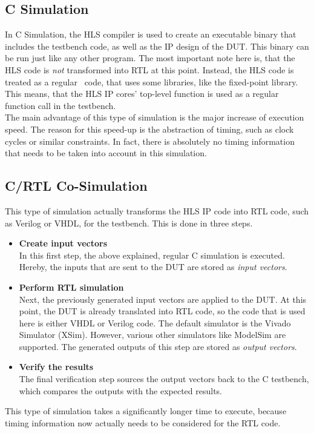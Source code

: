 \subsection{C Simulation}

In C Simulation, the HLS compiler is used to create an executable binary that includes the testbench code, as well as the IP design of the DUT.
This binary can be run just like any other program.
The most important note here is, that the HLS code is \textit{not} transformed into RTL at this point.
Instead, the HLS code is treated as a regular \cplusplus\ code, that uses some libraries, like the fixed-point library.
This means, that the HLS IP cores' top-level function is used as a regular function call in the testbench.\\

The main advantage of this type of simulation is the major increase of execution speed.
The reason for this speed-up is the abstraction of timing, such as clock cycles or similar constraints.
In fact, there is absolutely no timing information that needs to be taken into account in this simulation.

\subsection{C/RTL Co-Simulation}

This type of simulation actually transforms the HLS IP code into RTL code, such as Verilog or VHDL, for the testbench.
This is done in three steps.\\

\begin{itemize}
  \item \textbf{Create input vectors}\\
  In this first step, the above explained, regular C simulation is executed.
  Hereby, the inputs that are sent to the DUT are stored as \textit{input vectors}.
  \item \textbf{Perform RTL simulation}\\
  Next, the previously generated input vectors are applied to the DUT.
  At this point, the DUT is already translated into RTL code, so the code that is used here is either VHDL or Verilog code.
  The default simulator is the Vivado Simulator (XSim).
  However, various other simulators like ModelSim are supported.
  The generated outputs of this step are stored as \textit{output vectors}.
  \item \textbf{Verify the results}\\
  The final verification step sources the output vectors back to the C testbench, which compares the outputs with the expected results.\\
\end{itemize}

\noindent
This type of simulation takes a significantly longer time to execute, because timing information now actually needs to be considered for the RTL code.
